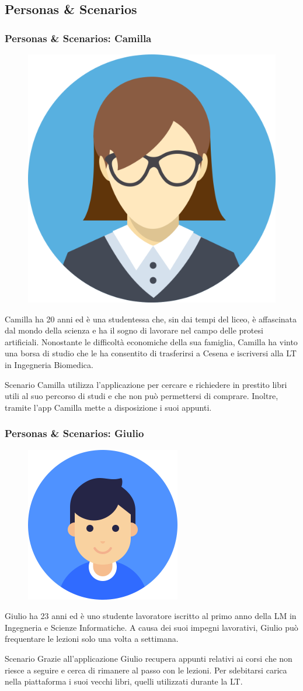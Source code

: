 \documentclass{beamer}
\begin{document}
\subsection{Personas \& Scenarios}

\begin{frame}
\frametitle{Personas \& Scenarios: Camilla}
\begin{figure}
\includegraphics[width=0.15\linewidth]{images/user_f.png}
\end{figure}
\begin{block}{}
Camilla ha 20 anni ed è una studentessa che, sin dai tempi del liceo, è affascinata dal mondo della scienza e ha il sogno di lavorare nel campo delle protesi artificiali. Nonostante le difficoltà economiche della sua famiglia, Camilla ha vinto una borsa di studio che le ha consentito di trasferirsi a Cesena e iscriversi alla LT in Ingegneria Biomedica.
\end{block}
\begin{block}{Scenario}
Camilla utilizza l'applicazione per cercare e richiedere in prestito libri utili al suo percorso di studi e che non può permettersi di comprare. Inoltre, tramite l'app Camilla mette a disposizione i suoi appunti.
\end{block}
\end{frame}
\begin{frame}
\frametitle{Personas \& Scenarios: Giulio}
\begin{figure}
\includegraphics[width=0.17\linewidth]{images/user.png}
\end{figure}
\begin{block}{}
Giulio ha 23 anni ed è uno studente lavoratore iscritto al primo anno della LM in Ingegneria e Scienze Informatiche. A causa dei suoi impegni lavorativi, Giulio può frequentare le lezioni solo una volta a settimana.
\end{block}
\begin{block}{Scenario}
Grazie all'applicazione Giulio recupera appunti relativi ai corsi che non riesce a seguire e cerca di rimanere al passo con le lezioni. Per sdebitarsi carica nella piattaforma i suoi vecchi libri, quelli utilizzati durante la LT.
\end{block}
\end{frame}
\end{document}
